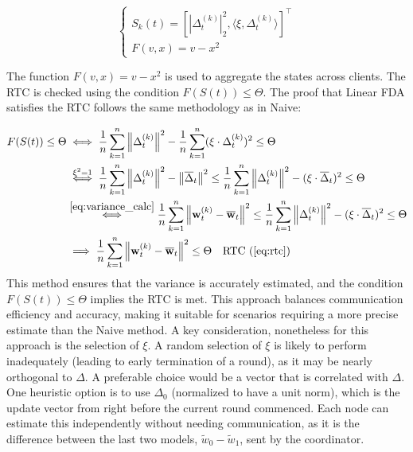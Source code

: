 \begin{equation}
    \begin{cases}
        S_k(t) = \left[|\Delta_t^{(k)}|_2^2, \langle \xi, \Delta_t^{(k)} \rangle\right]^\top \\
        F(v, x) = v - x^2
    \end{cases}
    \label{eq:linear_redefinition}
\end{equation}

\noindent
The function $F(v, x) = v - x^2$ is used to aggregate the states across clients. The RTC is checked using the condition $F(S(t)) \leq \Theta$.
The proof that Linear FDA satisfies the RTC follows the same methodology as in Naive:

\begin{align}
    F(S(t)) \leq \Theta & \iff \frac{1}{n} \sum_{k=1}^{n} \left\| \Delta_{t}^{(k)} \right\|^2 - \frac{1}{n} \sum_{k=1}^{n} (\xi \cdot \Delta_{t}^{(k)})^2 \leq \Theta \notag                                                                                                                 \\
                        & \overset{\xi^2 = 1}{\iff} \frac{1}{n} \sum_{k=1}^{n} \left\| \Delta_{t}^{(k)} \right\|^2 - \left\| \overline{\Delta}_{t} \right\|^2 \leq \frac{1}{n} \sum_{k=1}^{n} \left\| \Delta_{t}^{(k)} \right\|^2 - (\xi \cdot \overline{\Delta}_{t})^2 \leq \Theta \notag   \\
                        & \overset{\ref{eq:variance_calc}}{\iff} \frac{1}{n} \sum_{k=1}^{n} \left\| \mathbf{w}_{t}^{(k)} - \overline{\mathbf{w}}_{t} \right\|^2 \leq \frac{1}{n} \sum_{k=1}^{n} \left\| \Delta_{t}^{(k)} \right\|^2 - (\xi \cdot \overline{\Delta}_{t})^2 \leq \Theta \notag \\
                        & \implies \frac{1}{n} \sum_{k=1}^{n} \left\| \mathbf{w}_{t}^{(k)} - \overline{\mathbf{w}}_{t} \right\|^2 \leq \Theta \quad \text{RTC (\Cref{eq:rtc})}
\end{align}
\noindent
This method ensures that the variance is accurately estimated, and the condition $F(S(t)) \leq \Theta$ implies the RTC is met.
This approach balances communication efficiency and accuracy, making it suitable for scenarios requiring a more precise
estimate than the Naive method. A key consideration, nonetheless for this approach is the selection of $\xi$. A random selection of $\xi$
is likely to perform inadequately (leading to early termination of a round), as it may be nearly orthogonal to $\Delta$. A preferable
choice would be a vector that is correlated with $\Delta$. One heuristic option is to use $\Delta_0$ (normalized to have a unit norm),
which is the update vector from right before the current round commenced. Each node can estimate this independently without needing
communication, as it is the difference between the last two models, $\tilde{w}_0 - \tilde{w}_1$, sent by the coordinator.

